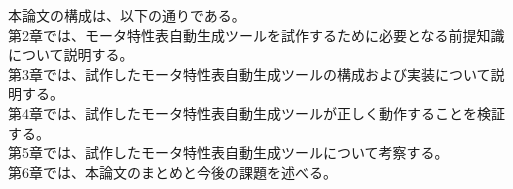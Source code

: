 
本論文の構成は、以下の通りである。\\
第2章では、モータ特性表自動生成ツールを試作するために必要となる前提知識について説明する。\\
第3章では、試作したモータ特性表自動生成ツールの構成および実装について説明する。\\
第4章では、試作したモータ特性表自動生成ツールが正しく動作することを検証する。\\
第5章では、試作したモータ特性表自動生成ツールについて考察する。\\
第6章では、本論文のまとめと今後の課題を述べる。\\